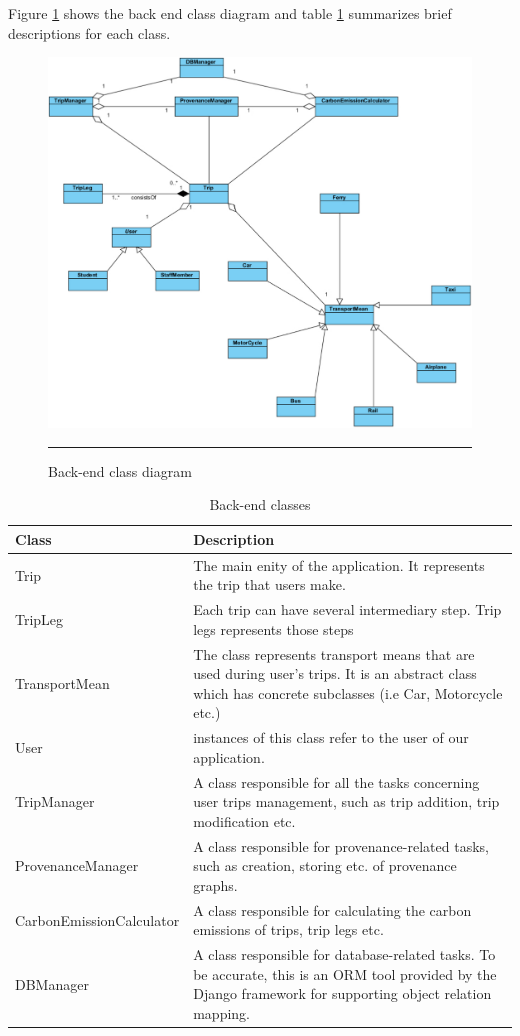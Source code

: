 Figure \ref{fig:backEndClassDiagram} shows the back end class diagram and table \ref{backEndClasses} summarizes brief descriptions for each class.

\begin{figure}[htbp]
	\centering
		\includegraphics[scale=0.50]{./Figures/chapter4/figure6.pdf}
		\rule{35em}{0.5pt}
	\caption[Back-end class diagram]{Back-end class diagram}
	\label{fig:backEndClassDiagram}
\end{figure}

\begin{table}
  \centering
  \begin{tabular}{|p{150px}|p{250px}|}
    \hline
    Class  & Description\\
    \hline
    Trip & The main enity of the application. It represents the trip that users make. \\
    TripLeg & Each trip can have several intermediary step. Trip legs represents those steps \\
    TransportMean & The class represents transport means that are used during user's trips. It is an abstract class which has concrete subclasses (i.e Car, Motorcycle etc.) \\
    User & instances of this class refer to the user of our application. \\
    TripManager & A class responsible for all the tasks concerning user trips management, such as trip addition, trip modification etc. \\
    ProvenanceManager & A class responsible for provenance-related tasks, such as creation, storing etc. of provenance graphs. \\
    CarbonEmissionCalculator & A class responsible for calculating the carbon emissions of trips, trip legs etc. \\
    DBManager & A class responsible for database-related tasks. To be accurate, this is an ORM tool provided by the Django framework for supporting object relation mapping. \\
    \hline
  \end{tabular}
  \caption{Back-end classes}\label{backEndClasses}
\end{table}

